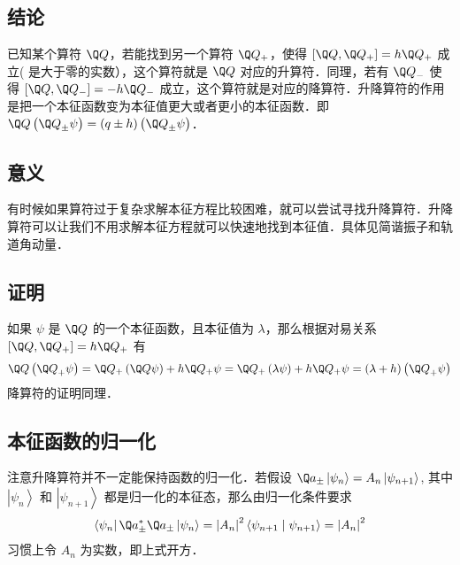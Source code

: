 

\subsection{结论}

已知某个算符 $\Q Q$，若能找到另一个算符 ${\Q Q_ + }$，使得 $[\Q Q,{\Q Q_ + }] = h{\Q Q_ + }$ 成立( 是大于零的实数），这个算符就是 $\Q Q$ 对应的升算符．同理，若有 ${\Q Q_- }$ 使得 $[\Q Q,{\Q Q_ - }] =  - h{\Q Q_ - }$ 成立，这个算符就是对应的降算符．升降算符的作用是把一个本征函数变为本征值更大或者更小的本征函数．即 $\Q Q\left( {{{\Q Q}_ \pm }\psi } \right) = \left( {q \pm h} \right)\left( {{{\Q Q}_ \pm }\psi } \right)$．

\subsection{意义}
有时候如果算符过于复杂求解本征方程比较困难，就可以尝试寻找升降算符．升降算符可以让我们不用求解本征方程就可以快速地找到本征值．具体见简谐振子和轨道角动量．%

\subsection{证明}
如果 $\psi$ 是 $\Q Q$ 的一个本征函数，且本征值为 $\lambda$，那么根据对易关系 $[\Q Q,{\Q Q_ + }] = h{\Q Q_ + }$ 有
\begin{equation}
\Q Q\left( {{{\Q Q}_ + }\psi } \right) = {\Q Q_ + }\left( {\Q Q\psi } \right) + h{\Q Q_ + }\psi  = {\Q Q_ + }\left( {\lambda \psi } \right) + h{\Q Q_ + }\psi  = \left( {\lambda  + h} \right)\left( {{{\Q Q}_ + }\psi } \right)
\end{equation}
降算符的证明同理．

\subsection{本征函数的归一化}
注意升降算符并不一定能保持函数的归一化．若假设 ${\Q a_ \pm }\left| {{\psi_n}} \right\rangle  = {A_n}\left| {{\psi_{n + 1}}} \right\rangle$, 其中 $\left| {{\psi_n}} \right\rangle$ 和 $\left| {{\psi_{n + 1}}} \right\rangle$ 都是归一化的本征态，那么由归一化条件要求
\begin{equation}
\left\langle {\psi_n} \right|\Q a_ \pm ^ * {\Q a_ \pm }\left| {\psi_n} \right\rangle  = {\left| {A_n} \right|^2}\left\langle {\psi_{n + 1}}
 \mathrel{\left | {\vphantom {{\psi_{n + 1}} {\psi_{n + 1}}}}
 \right. \kern-\nulldelimiterspace}
 {\psi_{n + 1}} \right\rangle  = {\left| {A_n} \right|^2}
\end{equation}
习惯上令 $A_n$ 为实数，即上式开方． 
